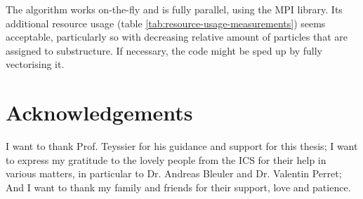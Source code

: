 The algorithm works on-the-fly and is fully parallel, using the MPI library.
Its additional resource usage (table \ref{tab:resource-usage-measurements}) seems acceptable, particularly so with decreasing relative amount of particles that are assigned to substructure.
If necessary, the code might be sped up by fully vectorising it.















\section*{Acknowledgements}

I want to thank Prof. Teyssier for his guidance and support for this thesis;
I want to express my gratitude to the lovely people from the ICS for their help in various matters, in particular to Dr. Andreas Bleuler and Dr. Valentin Perret; And I want to thank my family and friends for their support, love and patience.





